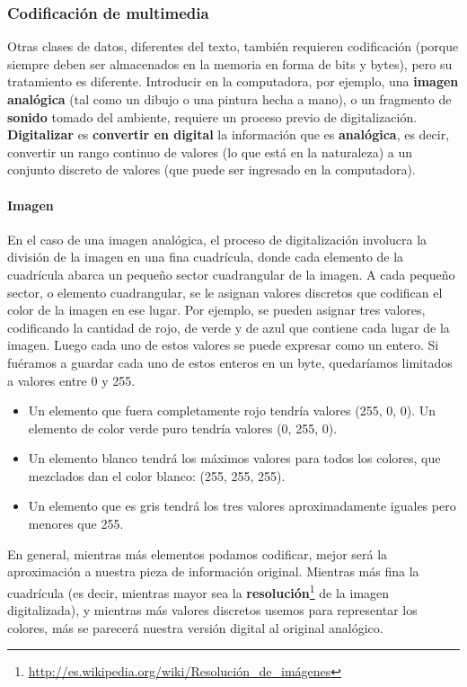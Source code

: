 \documentclass[a4paper]{article}
\newcommand\liststyleLii{%
\renewcommand\labelitemi{{\textbullet}}
\renewcommand\labelitemii{${\circ}$}
\renewcommand\labelitemiii{${\blacksquare}$}
\renewcommand\labelitemiv{{\textbullet}}
}
\begin{document}
\subsubsection{Codificación de multimedia}
Otras clases de datos, diferentes del texto, también requieren
codificación (porque siempre deben ser almacenados en la memoria en
forma de bits y bytes), pero su tratamiento es diferente. Introducir en
la computadora, por ejemplo, una \textbf{imagen analógica }(tal como
un dibujo o una pintura hecha a mano), o un fragmento de
\textbf{sonido} tomado del ambiente, requiere un proceso previo de
digitalización. \textbf{Digitalizar} es \textbf{convertir en digital}
la información que es \textbf{analógica}, es decir, convertir un
rango continuo de valores (lo que está en la naturaleza) a un
conjunto discreto de valores (que puede ser ingresado en la
computadora).

\paragraph[Imagen ]{Imagen }
En el caso de una imagen analógica, el proceso de digitalización
involucra la división de la imagen en una fina cuadrícula, donde
cada elemento de la cuadrícula abarca un pequeño sector
cuadrangular de la imagen. A cada pequeño sector, o elemento
cuadrangular, se le asignan valores discretos que codifican el color de
la imagen en ese lugar. Por ejemplo, se pueden asignar tres valores,
codificando la cantidad de rojo, de verde y de azul que contiene cada
lugar de la imagen. Luego cada uno de estos valores se puede expresar
como un entero. Si fuéramos a guardar cada uno de estos enteros en un
byte, quedaríamos limitados a valores entre 0 y 255. 

\liststyleLii
\begin{itemize}
\item Un elemento que fuera completamente rojo tendría valores (255,
0, 0). Un elemento de color verde puro tendría valores (0, 255, 0). 
\item Un elemento blanco tendrá los máximos valores para todos los
colores, que mezclados dan el color blanco: (255, 255, 255). 
\item Un elemento que es gris tendrá los tres valores aproximadamente
iguales pero menores que 255. 
\end{itemize}
En general, mientras más elementos podamos codificar, mejor será la
aproximación a nuestra pieza de información original. Mientras
más fina la cuadrícula (es decir, mientras mayor sea la
\textbf{resolución}\footnote{\url{http://es.wikipedia.org/wiki/Resolución\_de\_imágenes}}
de la imagen digitalizada), y mientras más valores discretos usemos
para representar los colores, más se parecerá nuestra versión
digital al original analógico.
\end{document}
